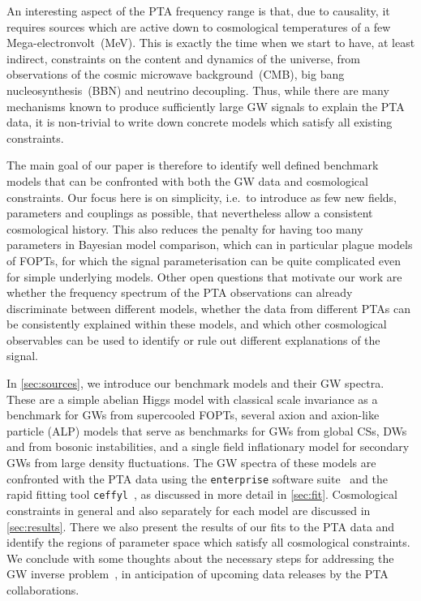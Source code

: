 \documentclass{article}
\begin{document}
An interesting aspect of the PTA frequency range is that, due to causality, it requires sources which are active down to cosmological temperatures of a few Mega-electronvolt~(MeV). This is exactly the time when we start to have, at least indirect, constraints on the content and dynamics of the universe, from observations of the cosmic microwave background~(CMB), big bang nucleosynthesis~(BBN) and neutrino decoupling. Thus, while there are many mechanisms known to produce sufficiently large GW signals to explain the PTA data, it is non-trivial to write down concrete models which satisfy all existing constraints. 

The main goal of our paper is therefore to identify well defined benchmark models that can be confronted with both the GW data and cosmological constraints. Our focus here is on simplicity, i.e.\ to introduce as few new fields, parameters and couplings as possible, that nevertheless allow a consistent cosmological history. This also reduces the penalty for having too many parameters in Bayesian model comparison, which can in particular plague models of FOPTs, for which the signal parameterisation can be quite complicated even for simple underlying models. 
Other open questions that motivate our work are whether the frequency spectrum of the PTA observations can already discriminate between different models, whether the data from different PTAs can be consistently explained within these models, and which other cosmological observables can be used to identify or rule out different explanations of the signal. 

In \cref{sec:sources}, we introduce our benchmark models and their GW spectra. These are a simple abelian Higgs model with classical scale invariance as a benchmark for GWs from supercooled FOPTs, several axion and axion-like particle (ALP) models that serve as benchmarks for GWs from global CSs, DWs and from bosonic instabilities, and a single field inflationary model for secondary GWs from large density fluctuations. The GW spectra of these models are confronted with the PTA data using the \texttt{enterprise} software suite~\cite{enterprise,enterprise_extensions} and the rapid fitting tool \texttt{ceffyl}~\cite{Lamb:2023jls}, as discussed in more detail in \cref{sec:fit}. Cosmological constraints in general and also separately for each model are discussed in \cref{sec:results}. There we also present the results of our fits to the PTA data and identify the regions of parameter space which satisfy all cosmological constraints. We conclude with some thoughts about the necessary steps for addressing the GW inverse problem~\cite{Friedrich:2022cak}, in anticipation of upcoming data releases by the PTA collaborations. 
\end{document}
